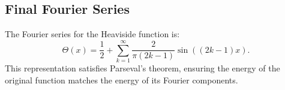 \subsection{Final Fourier Series}

The Fourier series for the Heaviside function is:
\begin{equation}
\Theta(x) = \frac{1}{2} + \sum_{k=1}^\infty \frac{2}{\pi(2k-1)} \sin((2k-1)x).
\label{eq:final-series}
\end{equation}
This representation satisfies Parseval's theorem, ensuring the energy of the original function matches the energy of its Fourier components.

%
\endinput  %
